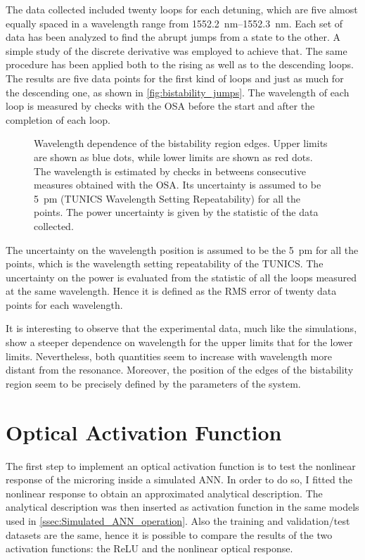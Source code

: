 The data collected included twenty loops for each detuning, which are five almost equally spaced in a wavelength range from \SIrange{1552.2}{1552.3}{\nm}.
Each set of data has been analyzed to find the abrupt jumps from a state to the other.
A simple study of the discrete derivative was employed to achieve that.
The same procedure has been applied both to the rising as well as to the descending loops.
The results are five data points for the first kind of loops and just as much for the descending one, as shown in \autoref{fig:bistability_jumps}.
The wavelength of each loop is measured by checks with the \acs{OSA} before the start and after the completion of each loop.

\begin{figure}[!hbtp]
	\centering
	
	\caption{Wavelength dependence of the bistability region edges.
		Upper limits are shown as blue dots, while lower limits are shown as red dots.
		The wavelength is estimated by checks in betweens consecutive measures obtained with the \acs{OSA}.
		Its uncertainty is assumed to be \SI{5}{\pm} (TUNICS Wavelength Setting Repeatability) for all the points.
		The power uncertainty is given by the statistic of the data collected. %
	}
	\label{fig:bistability_jumps}
\end{figure}

The uncertainty on the wavelength position is assumed to be the \SI{5}{\pm} for all the points, which is the wavelength setting repeatability of the TUNICS.
The uncertainty on the power is evaluated from the statistic of all the loops measured at the same wavelength.
Hence it is defined as the RMS error of twenty data points for each wavelength.

It is interesting to observe that the experimental data, much like the simulations, show a steeper dependence on wavelength for the upper limits that for the lower limits.
Nevertheless, both quantities seem to increase with wavelength more distant from the resonance.
Moreover, the position of the edges of the bistability region seem to be precisely defined by the parameters of the system.

\section{Optical Activation Function}
\label{sec:Optical_Activation_Function}
The first step to implement an optical activation function is to test the nonlinear response of the microring inside a simulated \ac{ANN}.
In order to do so, I fitted the nonlinear response to obtain an approximated analytical description.
The analytical description was then inserted as activation function in the same models used in \autoref{ssec:Simulated_ANN_operation}.
Also the training and validation/test datasets are the same, hence it is possible to compare the results of the two activation functions: the \ac{ReLU} and the nonlinear optical response.

